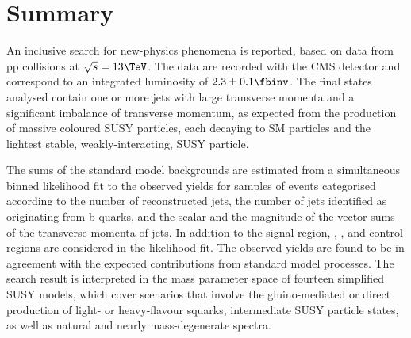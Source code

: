 \section{Summary}
\label{sec:summary}

An inclusive search for new-physics phenomena is reported, based on
data from pp collisions at $\sqrt{s} = 13\TeV$. The data are recorded
with the CMS detector and correspond to an integrated luminosity of
$2.3 \pm 0.1 \fbinv$. The final states analysed contain one or more
jets with large transverse momenta and a significant imbalance of
transverse momentum, as expected from the production of massive
coloured SUSY particles, each decaying to SM particles and the
lightest stable, weakly-interacting, SUSY particle.


The sums of the standard model backgrounds are estimated from a
simultaneous binned likelihood fit to the observed yields for samples
of events categorised according to the number of reconstructed jets,
the number of jets identified as originating from b quarks, and the
scalar and the magnitude of the vector sums of the transverse momenta
of jets. In addition to the signal region, \mj, \mmj, and \gj control
regions are considered in the likelihood fit. The observed yields are
found to be in agreement with the expected contributions from standard
model processes.  The search result is interpreted in the mass
parameter space of fourteen simplified SUSY models, 
which cover scenarios that involve the gluino-mediated or direct
production of light- or heavy-flavour squarks, intermediate SUSY
particle states, as well as natural and nearly mass-degenerate
spectra.

